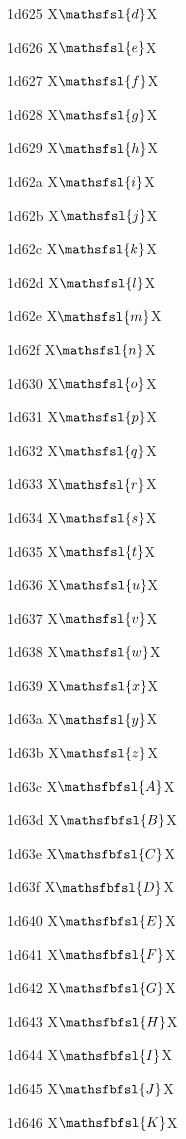 \documentclass[11pt]{article}
\begin{document}
1d625 X{\ensuremath{\mathsfsl{d}}}X

1d626 X{\ensuremath{\mathsfsl{e}}}X

1d627 X{\ensuremath{\mathsfsl{f}}}X

1d628 X{\ensuremath{\mathsfsl{g}}}X

1d629 X{\ensuremath{\mathsfsl{h}}}X

1d62a X{\ensuremath{\mathsfsl{i}}}X

1d62b X{\ensuremath{\mathsfsl{j}}}X

1d62c X{\ensuremath{\mathsfsl{k}}}X

1d62d X{\ensuremath{\mathsfsl{l}}}X

1d62e X{\ensuremath{\mathsfsl{m}}}X

1d62f X{\ensuremath{\mathsfsl{n}}}X

1d630 X{\ensuremath{\mathsfsl{o}}}X

1d631 X{\ensuremath{\mathsfsl{p}}}X

1d632 X{\ensuremath{\mathsfsl{q}}}X

1d633 X{\ensuremath{\mathsfsl{r}}}X

1d634 X{\ensuremath{\mathsfsl{s}}}X

1d635 X{\ensuremath{\mathsfsl{t}}}X

1d636 X{\ensuremath{\mathsfsl{u}}}X

1d637 X{\ensuremath{\mathsfsl{v}}}X

1d638 X{\ensuremath{\mathsfsl{w}}}X

1d639 X{\ensuremath{\mathsfsl{x}}}X

1d63a X{\ensuremath{\mathsfsl{y}}}X

1d63b X{\ensuremath{\mathsfsl{z}}}X

1d63c X{\ensuremath{\mathsfbfsl{A}}}X

1d63d X{\ensuremath{\mathsfbfsl{B}}}X

1d63e X{\ensuremath{\mathsfbfsl{C}}}X

1d63f X{\ensuremath{\mathsfbfsl{D}}}X

1d640 X{\ensuremath{\mathsfbfsl{E}}}X

1d641 X{\ensuremath{\mathsfbfsl{F}}}X

1d642 X{\ensuremath{\mathsfbfsl{G}}}X

1d643 X{\ensuremath{\mathsfbfsl{H}}}X

1d644 X{\ensuremath{\mathsfbfsl{I}}}X

1d645 X{\ensuremath{\mathsfbfsl{J}}}X

1d646 X{\ensuremath{\mathsfbfsl{K}}}X
\end{document}
